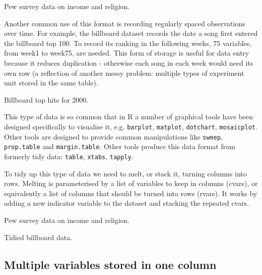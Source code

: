 \documentclass[oneside]{article}
\begin{document}
\begin{table}[htbp]
  \centering
  
  \caption{Pew survey data on income and religion.}
  \label{tbl:pew-raw}
\end{table}

Another common use of this format is recording regularly spaced observations over time. For example, the billboard dataset records the date a song first entered the billboard top 100. To record its ranking in the following weeks, 75 variables, from week1 to week75, are needed. This form of storage is useful for data entry because it reduces duplication - otherwise each song in each week would need its own row (a reflection of another messy problem: multiple types of experiment unit stored in the same table).

\begin{table}[htbp]
  \centering
  
  \caption{Billboard top hits for 2000.}
  \label{tbl:billboard-raw}
\end{table}

This type of data is so common that in R a number of graphical tools have been designed specifically to visualise it, e.g. {\tt barplot}, {\tt matplot}, {\tt dotchart}, {\tt mosaicplot}. Other tools are designed to provide common manipulations like {\tt sweep}, {\tt prop.table} and {\tt margin.table}. Other tools produce this data format from formerly tidy data: {\tt table}, {\tt xtabs}, {\tt tapply}.

To tidy up this type of data we need to melt, or stack it, turning columns into rows. Melting is parameterised by a list of variables to keep in columns (cvars), or equivalently a list of columns that should be turned into rows (rvars). It works by adding a new indicator variable to the dataset and stacking the repeated cvars.

\begin{table}[htbp]
  \centering
  
  \caption{Pew survey data on income and religion.}
  \label{tbl:pew-clean}
\end{table}

\begin{table}[htbp]
  \centering
  
  \caption{Tidied billboard data.}
  \label{tbl:billboard-clean}
\end{table}


\subsection{Multiple variables stored in one column}
\end{document}
